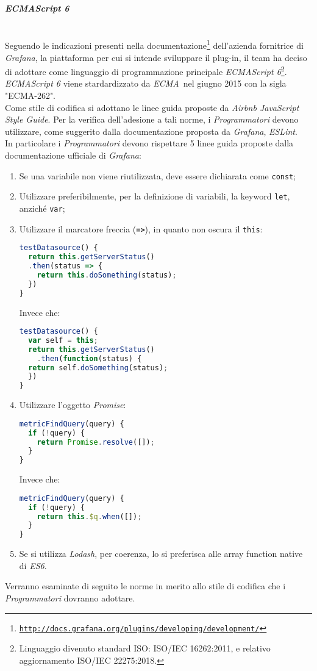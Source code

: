 \paragraph{\textit{ECMAScript 6}}\label{EcmaScript6} \-\\
Seguendo le indicazioni presenti nella documentazione\footnote{\texttt{\url{http://docs.grafana.org/plugins/developing/development/}}} dell'azienda fornitrice di \textit{Grafana}, la piattaforma  per cui si intende sviluppare il plug-in, il team ha deciso di adottare come linguaggio di programmazione principale \textit{ECMAScript 6}\footnote{Linguaggio divenuto standard ISO: ISO/IEC 16262:2011, e relativo aggiornamento ISO/IEC 22275:2018.}.\\
\textit{ECMAScript 6} viene stardardizzato da \textit{ECMA}\glossario\ nel giugno 2015 con la sigla "ECMA-262".\\
Come stile di codifica si adottano le linee guida proposte da \textit{Airbnb JavaScript Style Guide}. Per la verifica dell'adesione a tali norme, i \textit{Programmatori} devono utilizzare, come suggerito dalla documentazione proposta da \textit{Grafana}, \textit{ESLint}\glossario.\\
In particolare i \textit{Programmatori} devono rispettare 5 linee guida proposte dalla documentazione ufficiale di \textit{Grafana}:
\begin{enumerate}
	\item Se una variabile non viene riutilizzata, deve essere dichiarata come \texttt{const};
	\item Utilizzare preferibilmente, per la definizione di variabili, la keyword  \texttt{let}, anziché  \texttt{var};
	\item Utilizzare il marcatore freccia (\texttt{\textbf{=>}}), in quanto non oscura il \texttt{this}:
	\begin{lstlisting}[language=JavaScript]
testDatasource() {
  return this.getServerStatus()
  .then(status => {
    return this.doSomething(status);
  })
}	
	\end{lstlisting}
	Invece che:
	\begin{lstlisting}[language=JavaScript]
testDatasource() {
  var self = this;
  return this.getServerStatus()
    .then(function(status) {
  return self.doSomething(status);
  })
}
	\end{lstlisting}
	\item Utilizzare l'oggetto \textit{Promise}:
	\begin{lstlisting}[language=JavaScript]
metricFindQuery(query) {
  if (!query) {
    return Promise.resolve([]);
  }
}	
	\end{lstlisting}
	Invece che:
	\begin{lstlisting}[language=JavaScript]
metricFindQuery(query) {
  if (!query) {
    return this.$q.when([]);
  }
}
	\end{lstlisting}
	\item Se si utilizza \textit{Lodash}\glossario, per coerenza, lo si preferisca alle array function native di \textit{ES6}.
\end{enumerate}
Verranno esaminate di seguito le norme in merito allo stile di codifica che i \textit{Programmatori} dovranno adottare.

